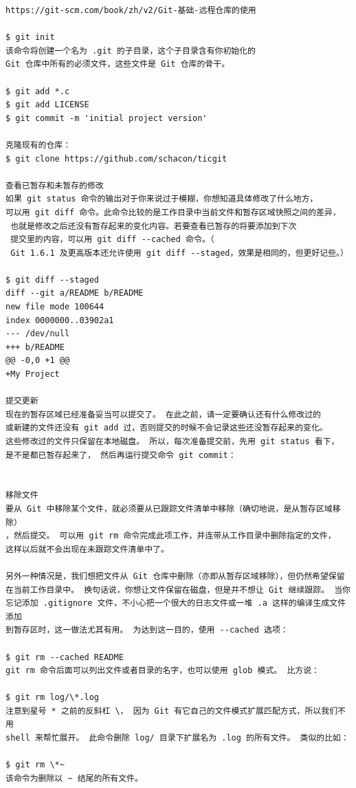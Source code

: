 \begin{verbatim}
https://git-scm.com/book/zh/v2/Git-基础-远程仓库的使用

$ git init
该命令将创建一个名为 .git 的子目录，这个子目录含有你初始化的 
Git 仓库中所有的必须文件，这些文件是 Git 仓库的骨干。

$ git add *.c
$ git add LICENSE
$ git commit -m 'initial project version'

克隆现有的仓库：
$ git clone https://github.com/schacon/ticgit

查看已暂存和未暂存的修改
如果 git status 命令的输出对于你来说过于模糊，你想知道具体修改了什么地方，
可以用 git diff 命令。此命令比较的是工作目录中当前文件和暂存区域快照之间的差异，
 也就是修改之后还没有暂存起来的变化内容。若要查看已暂存的将要添加到下次
 提交里的内容，可以用 git diff --cached 命令。（
 Git 1.6.1 及更高版本还允许使用 git diff --staged，效果是相同的，但更好记些。）

$ git diff --staged
diff --git a/README b/README
new file mode 100644
index 0000000..03902a1
--- /dev/null
+++ b/README
@@ -0,0 +1 @@
+My Project

提交更新
现在的暂存区域已经准备妥当可以提交了。 在此之前，请一定要确认还有什么修改过的
或新建的文件还没有 git add 过，否则提交的时候不会记录这些还没暂存起来的变化。 
这些修改过的文件只保留在本地磁盘。 所以，每次准备提交前，先用 git status 看下，
是不是都已暂存起来了， 然后再运行提交命令 git commit：


移除文件
要从 Git 中移除某个文件，就必须要从已跟踪文件清单中移除（确切地说，是从暂存区域移除）
，然后提交。 可以用 git rm 命令完成此项工作，并连带从工作目录中删除指定的文件，
这样以后就不会出现在未跟踪文件清单中了。

另外一种情况是，我们想把文件从 Git 仓库中删除（亦即从暂存区域移除），但仍然希望保留
在当前工作目录中。 换句话说，你想让文件保留在磁盘，但是并不想让 Git 继续跟踪。 当你
忘记添加 .gitignore 文件，不小心把一个很大的日志文件或一堆 .a 这样的编译生成文件添加
到暂存区时，这一做法尤其有用。 为达到这一目的，使用 --cached 选项：

$ git rm --cached README
git rm 命令后面可以列出文件或者目录的名字，也可以使用 glob 模式。 比方说：

$ git rm log/\*.log
注意到星号 * 之前的反斜杠 \， 因为 Git 有它自己的文件模式扩展匹配方式，所以我们不用 
shell 来帮忙展开。 此命令删除 log/ 目录下扩展名为 .log 的所有文件。 类似的比如：

$ git rm \*~
该命令为删除以 ~ 结尾的所有文件。




\end{verbatim}

